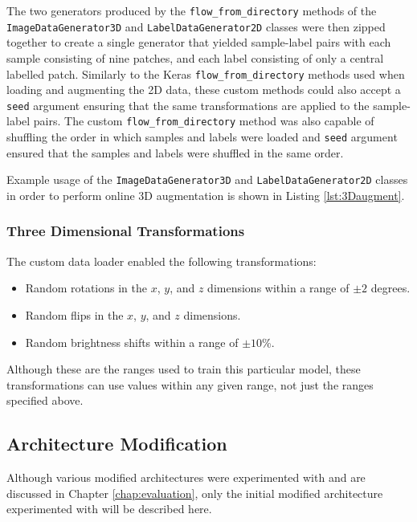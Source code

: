The two generators produced by the \texttt{flow\_from\_directory} methods of the \texttt{ImageDataGenerator3D} and \texttt{LabelDataGenerator2D} classes were then zipped together to create a single generator that yielded sample-label pairs with each sample consisting of nine patches, and each label consisting of only a central labelled patch. Similarly to the Keras \texttt{flow\_from\_directory} methods used when loading and augmenting the 2D data, these custom methods could also accept a \texttt{seed} argument ensuring that the same transformations are applied to the sample-label pairs. The custom \texttt{flow\_from\_directory} method was also capable of shuffling the order in which samples and labels were loaded and \texttt{seed} argument ensured that the samples and labels were shuffled in the same order.

Example usage of the \texttt{ImageDataGenerator3D} and \texttt{LabelDataGenerator2D} classes in order to perform online 3D augmentation is shown in Listing \ref{lst:3Daugment}.

\subsubsection{Three Dimensional Transformations}
\label{sec:3daug}

The custom data loader enabled the following transformations:
\begin{itemize}
    \item Random rotations in the $x$, $y$, and $z$ dimensions within a range of $\pm 2$ degrees.
    \item Random flips in the $x$, $y$, and $z$ dimensions.
    \item Random brightness shifts within a range of $\pm 10$\%.
\end{itemize}
Although these are the ranges used to train this particular model, these transformations can use values within any given range, not just the ranges specified above.


\subsection{Architecture Modification}

Although various modified architectures were experimented with and are discussed in Chapter \ref{chap:evaluation}, only the initial modified architecture experimented with will be described here.


